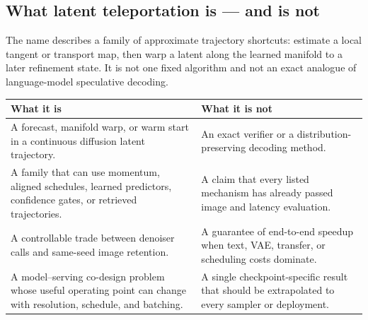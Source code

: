 \documentclass[11pt,a4paper]{article}
\begin{document}
\subsection*{What latent teleportation is --- and is not}

The name describes a family of approximate trajectory shortcuts: estimate a
local tangent or transport map, then warp a latent along the learned manifold to
a later refinement state. It is not one fixed algorithm and not an exact
analogue of language-model speculative decoding.

\begin{center}
\small
\begin{tabularx}{\textwidth}{@{}>{\raggedright\arraybackslash}X>{\raggedright\arraybackslash}X@{}}
\toprule
\textbf{What it is} & \textbf{What it is not} \\
\midrule
A forecast, manifold warp, or warm start in a continuous diffusion latent trajectory. & An exact verifier or a distribution-preserving decoding method. \\
A family that can use momentum, aligned schedules, learned predictors, confidence gates, or retrieved trajectories. & A claim that every listed mechanism has already passed image and latency evaluation. \\
A controllable trade between denoiser calls and same-seed image retention. & A guarantee of end-to-end speedup when text, VAE, transfer, or scheduling costs dominate. \\
A model--serving co-design problem whose useful operating point can change with resolution, schedule, and batching. & A single checkpoint-specific result that should be extrapolated to every sampler or deployment. \\
\bottomrule
\end{tabularx}
\end{center}
\end{document}
